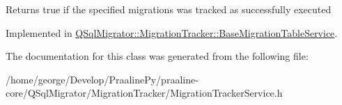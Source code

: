 \begin{DoxyReturn}{Returns}
true if the specified migrations was tracked as successfully executed 
\end{DoxyReturn}


Implemented in \hyperlink{class_q_sql_migrator_1_1_migration_tracker_1_1_base_migration_table_service_afaa1f00b646de9db114a82597a40f9ea}{Q\+Sql\+Migrator\+::\+Migration\+Tracker\+::\+Base\+Migration\+Table\+Service}.



The documentation for this class was generated from the following file\+:\begin{DoxyCompactItemize}
\item 
/home/george/\+Develop/\+Praaline\+Py/praaline-\/core/\+Q\+Sql\+Migrator/\+Migration\+Tracker/Migration\+Tracker\+Service.\+h\end{DoxyCompactItemize}
